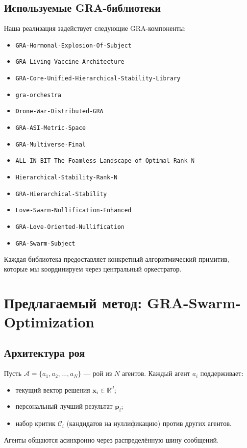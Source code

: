 \documentclass[12pt,a4paper]{article}
\begin{document}
\subsection{Используемые GRA-библиотеки}
\label{sec:libraries}
Наша реализация задействует следующие GRA-компоненты:
\begin{itemize}
    \item \texttt{GRA-Hormonal-Explosion-Of-Subject}
    \item \texttt{GRA-Living-Vaccine-Architecture}
    \item \texttt{GRA-Core-Unified-Hierarchical-Stability-Library}
    \item \texttt{gra-orchestra}
    \item \texttt{Drone-War-Distributed-GRA}
    \item \texttt{GRA-ASI-Metric-Space}
    \item \texttt{GRA-Multiverse-Final}
    \item \texttt{ALL-IN-BIT-The-Foamless-Landscape-of-Optimal-Rank-N}
    \item \texttt{Hierarchical-Stability-Rank-N}
    \item \texttt{GRA-Hierarchical-Stability}
    \item \texttt{Love-Swarm-Nullification-Enhanced}
    \item \texttt{GRA-Love-Oriented-Nullification}
    \item \texttt{GRA-Swarm-Subject}
\end{itemize}
Каждая библиотека предоставляет конкретный алгоритмический примитив, которые мы координируем через центральный оркестратор.

\section{Предлагаемый метод: GRA-Swarm-Optimization}

\subsection{Архитектура роя}
Пусть $\mathcal{A} = \{a_1, a_2, \dots, a_N\}$ — рой из $N$ агентов. Каждый агент $a_i$ поддерживает:
\begin{itemize}
    \item текущий вектор решения $\mathbf{x}_i \in \mathbb{R}^d$;
    \item персональный лучший результат $\mathbf{p}_i$;
    \item набор критик $\mathcal{C}_i$ (кандидатов на нуллификацию) против других агентов.
\end{itemize}
Агенты общаются асинхронно через распределённую шину сообщений.
\end{document}
